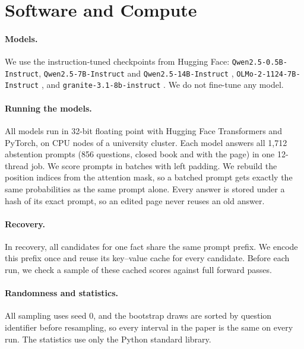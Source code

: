 \section{Software and Compute}
\label{app:compute}

\paragraph{Models.}
We use the instruction-tuned checkpoints from Hugging Face: \texttt{Qwen2.5-0.5B-Instruct}, \texttt{Qwen2.5-7B-Instruct} and \texttt{Qwen2.5-14B-Instruct} \citep{qwen2025qwen25}, \texttt{OLMo-2-1124-7B-Instruct} \citep{olmo2024olmo2}, and \texttt{granite-3.1-8b-instruct} \citep{granite2024}. We do not fine-tune any model.

\paragraph{Running the models.}
All models run in 32-bit floating point with Hugging Face Transformers and PyTorch, on CPU nodes of a university cluster. Each model answers all 1,712 abstention prompts (856 questions, closed book and with the page) in one 12-thread job. We score prompts in batches with left padding. We rebuild the position indices from the attention mask, so a batched prompt gets exactly the same probabilities as the same prompt alone. Every answer is stored under a hash of its exact prompt, so an edited page never reuses an old answer.

\paragraph{Recovery.}
In recovery, all candidates for one fact share the same prompt prefix. We encode this prefix once and reuse its key--value cache for every candidate. Before each run, we check a sample of these cached scores against full forward passes.

\paragraph{Randomness and statistics.}
All sampling uses seed 0, and the bootstrap draws are sorted by question identifier before resampling, so every interval in the paper is the same on every run. The statistics use only the Python standard library.
